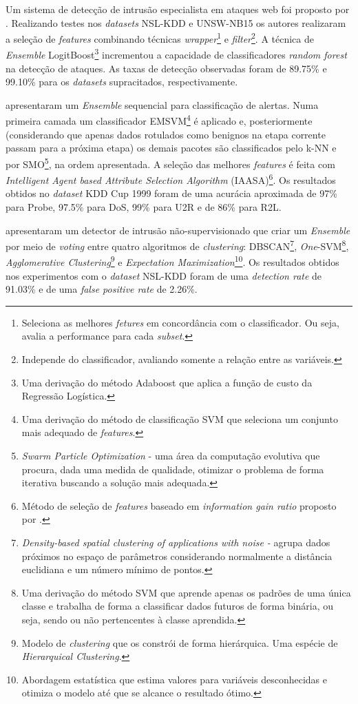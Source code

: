 Um sistema de detecção de intrusão especialista em ataques web foi proposto por . Realizando testes nos \textit{datasets} NSL-KDD e UNSW-NB15 os autores realizaram a seleção de \textit{features} combinando técnicas \textit{wrapper}\footnote{Seleciona as melhores \textit{fetures} em concordância com o classificador. Ou seja, avalia a performance para cada \textit{subset}.} e \textit{filter}\footnote{Independe do classificador, avaliando somente a relação entre as variáveis.}. A técnica de \textit{Ensemble} LogitBoost\footnote{Uma derivação do método Adaboost que aplica a função de custo da Regressão Logística.} incrementou a capacidade de classificadores \textit{random forest} na detecção de ataques. As taxas de detecção observadas foram de 89.75\% e 99.10\% para os \textit{datasets} supracitados, respectivamente.

 apresentaram um \textit{Ensemble} sequencial para classificação de alertas. Numa primeira camada um classificador EMSVM\footnote{Uma derivação do método de classificação SVM que seleciona um conjunto mais adequado de \textit{features}.} é aplicado e, posteriormente (considerando que apenas dados rotulados como benignos na etapa corrente passam para a próxima etapa) os demais pacotes são classificados pelo k-NN e por SMO\footnote{\textit{Swarm Particle Optimization} - uma área da computação evolutiva que procura, dada uma medida de qualidade, otimizar o problema de forma iterativa buscando a solução mais adequada.}, na ordem apresentada. A seleção das melhores \textit{features} é feita com \textit{Intelligent Agent based Attribute Selection Algorithm} (IAASA)\footnote{Método de seleção de \textit{features} baseado em \textit{information gain ratio} proposto por .}. Os resultados obtidos no \textit{dataset} KDD Cup 1999 foram de uma acurácia aproximada de 97\% para Probe, 97.5\% para DoS, 99\% para U2R e de 86\% para R2L.

 apresentaram um detector de intrusão não-supervisionado que criar um \textit{Ensemble} por meio de \textit{voting} entre quatro algoritmos de \textit{clustering}: DBSCAN\footnote{\textit{Density-based spatial clustering of applications with noise - } agrupa dados próximos no espaço de parâmetros considerando normalmente a distância euclidiana e um número mínimo de pontos.}, \textit{One}-SVM\footnote{Uma derivação do método SVM que aprende apenas os padrões de uma única classe e trabalha de forma a classificar dados futuros de forma binária, ou seja, sendo ou não pertencentes à classe aprendida.}, \textit{Agglomerative Clustering}\footnote{Modelo de \textit{clustering} que os constrói de forma hierárquica. Uma espécie de \textit{Hierarquical Clustering}.} e \textit{Expectation Maximization}\footnote{Abordagem estatística que estima valores para variáveis desconhecidas e otimiza o modelo até que se alcance o resultado ótimo.}. Os resultados obtidos nos experimentos com o \textit{dataset} NSL-KDD foram de uma \textit{detection rate} de 91.03\% e de uma \textit{false positive rate} de 2.26\%.

